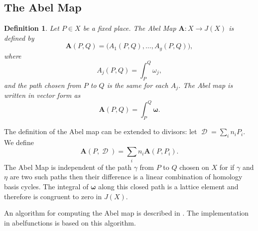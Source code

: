 \documentclass[12pt]{article}
\newtheorem{definition}[theorem]{Definition}
\theoremstyle{definition}
\DeclareMathOperator{\DivD}{\mathcal{D}}
\begin{document}
\subsection{The Abel Map}

\begin{definition}\label{def:abelmap}
  Let $P \in X$ be a fixed place. The Abel Map $\boldsymbol{A} : X \to
  J(X)$ is defined by
  \begin{equation} \label{eqn:abel1}
    \boldsymbol{A}(P,Q) = \big( A_1(P,Q), \ldots, A_g(P,Q) \big),
  \end{equation}
  where
  \begin{equation} \label{eqn:abel2}
    A_j(P,Q) = \int_P^Q \omega_j,
  \end{equation}
  and the path chosen from $P$ to $Q$ is the same for each $A_j$. The
  Abel map is written in vector form as
  \begin{equation} \label{eqn:abel-vector}
    \boldsymbol{A}(P,Q) = \int_P^Q \boldsymbol{\omega}.
  \end{equation}
\end{definition}
The definition of the Abel map can be extended to divisors: let $\DivD =
\sum_i n_i P_i$. We define
\begin{equation} \label{eqn:abel-divisors}
  \boldsymbol{A}(P,\DivD) = \sum_i n_i \boldsymbol{A}(P,P_i).
\end{equation}
The Abel Map is independent of the path $\gamma$ from $P$ to $Q$ chosen
on $X$ for if $\gamma$ and $\eta$ are two such paths then their
difference is a linear combination of homology basis cycles. The
integral of $\boldsymbol{\omega}$ along this closed path is a lattice
element and therefore is congruent to zero in $J(X)$.

An algorithm for computing the Abel map is described in
\cite{DeconinckPatterson11}. The implementation in {\sc abelfunctions}
is based on this algorithm.
\end{document}

